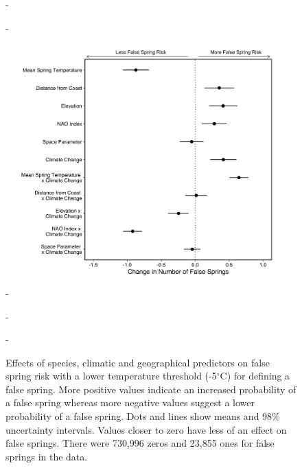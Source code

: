 \documentclass{article}\usepackage[]{graphicx}\usepackage[]{color}
\begin{document}
{\begin{figure} [H]
  -\begin{center}
  -\includegraphics[width=12cm]{..//analyses/figures/model_output_98_five.png}
  -\caption{Effects of species, climatic and geographical predictors on false spring risk with a lower temperature threshold (-5$^{\circ}$C) for defining a false spring. More positive values indicate an increased probability of a false spring whereas more negative values suggest a lower probability of a false spring. Dots and lines show means and 98\% uncertainty intervals. Values closer to zero have less of an effect on false springs. There were 730,996 zeros and 23,855 ones for false springs in the data.}\label{fig:five}
  -\end{center}
  -\end{figure}}
 
\end{document}
